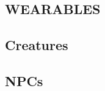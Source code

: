 \documentclass[11pt]{article} %
\begin{document}
\subsection{WEARABLES}
\label{app:wearables}
	
	
	
	
	
	
	
\newpage
\addtolength{\textheight}{1.9in}
\begin{landscape}
\subsection{Creatures}
	
\end{landscape}
\subsection{NPCs}
	
\end{document}
